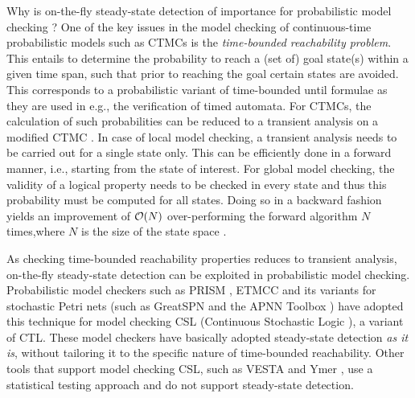 \documentclass{entcs}
\begin{document}
Why is on-the-fly steady-state detection of importance for probabilistic model checking \cite{Kwiatkowska_SLCS03}?
One of the key issues in the model checking of continuous-time probabilistic models such as 
CTMCs is the \emph{time-bounded reachability problem}. 
This entails to determine the probability to reach a (set of) goal state(s) within a given time span, 
such that prior to reaching the goal certain states are avoided. 
This corresponds to a probabilistic variant of time-bounded until formulae as they are used in 
e.g., the verification of timed automata.
For CTMCs, the calculation of such probabilities can be reduced to a transient analysis on a 
modified CTMC \cite{BaierHHK_TSE03}. 
In case of local model checking, a transient analysis needs to be carried out for a single state 
only.
This can be efficiently done in a forward manner, i.e., starting from the state of interest. 
For global model checking, the validity of a logical property needs to be checked in every state 
and thus this probability must be computed for all states. 
Doing so in a backward fashion yields an improvement of ${\cal O}(N)$ over-performing the forward algorithm $N$ times,where $N$ is the size of the state space \cite{KatoenKNP_LNCS01}.

As checking time-bounded reachability properties reduces to transient analysis, on-the-fly steady-state detection can be exploited in probabilistic model checking.
Probabilistic model checkers such as PRISM \cite{KwiatkowskaNP_QEST04}, ETMCC \cite{HermansKMS_IJSTTT03} and its variants for stochastic
Petri nets (such as GreatSPN \cite{DAprileDS_DS04} and the APNN Toolbox \cite{BuchholzFKT_MMECCS03}) have adopted this technique
for model checking CSL (Continuous Stochastic Logic \cite{AzizSSB_ACMTCL00,BaierHHK_TSE03}), a variant of CTL.
These model checkers have basically adopted steady-state detection \emph{as it is}, without 
tailoring it to the specific nature of time-bounded reachability.
Other tools that support model checking CSL, such as VESTA \cite{SenVA_CAV05} and Ymer \cite{Younes_CAV05}, use a statistical testing approach and do not support steady-state detection. 
\end{document}
